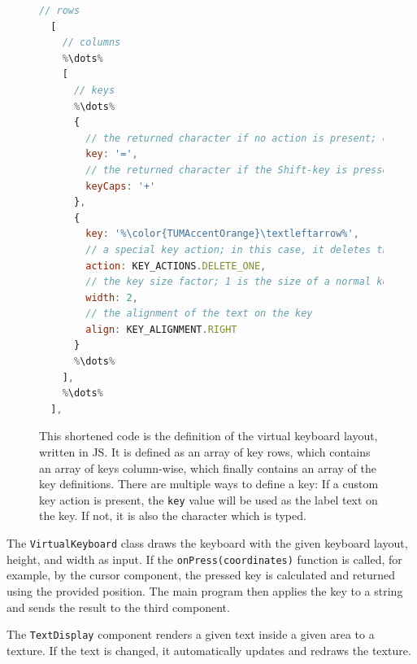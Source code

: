 \begin{figure}[H]
	\begin{lstlisting}[language=JavaScript]
  // rows
  [
    // columns
    %\dots%
    [ 
      // keys
      %\dots%
      {
        // the returned character if no action is present; otherwise just a label
        key: '=',
        // the returned character if the Shift-key is pressed
        keyCaps: '+'
      },
      {
        key: '%\color{TUMAccentOrange}\textleftarrow%',
        // a special key action; in this case, it deletes the last character
        action: KEY_ACTIONS.DELETE_ONE,
        // the key size factor; 1 is the size of a normal key
        width: 2, 
        // the alignment of the text on the key
        align: KEY_ALIGNMENT.RIGHT
      }
      %\dots%
    ],
    %\dots%
  ],
  \end{lstlisting}
	\caption[Virtual keyboard layout definition]{This shortened code is the definition of the virtual keyboard layout, written in \gls{JS}. It is defined as an array of key rows, which contains an array of keys column-wise, which finally contains an array of the key definitions. There are multiple ways to define a key: If a custom key action is present, the \lstinline{key} value will be used as the label text on the key. If not, it is also the character which is typed. }\label{fig:virtual-keyboard-layout}
\end{figure}

The \lstinline{VirtualKeyboard} class draws the keyboard with the given keyboard layout, height, and width as input. If the \lstinline{onPress(coordinates)} function is called, for example, by the cursor component, the pressed key is calculated and returned using the provided position. The main program then applies the key to a string and sends the result to the third component. %

The \lstinline{TextDisplay} component renders a given text inside a given area to a texture. If the text is changed, it automatically updates and redraws the texture.